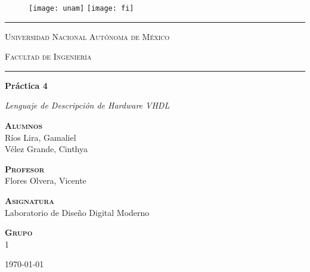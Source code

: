 \documentclass[../main.tex]{subfiles}
\begin{document}
\begin{titlepage}
  \begin{figure}[ht]
    \texttt{[image: unam]}
    \label{EscudoUNAM}
    \endminipage
    \texttt{[image: fi]}
    \label{EscudoFI}
    \endminipage
  \end{figure}

  \begin{center}
    \hrule height 0.5mm
    \vspace{0.2cm}
    \LARGE
    \textsc{Universidad Nacional Autónoma de México}

    \vfill
    \LARGE
    \textsc{Facultad de Ingeniería}
    \vspace{0.4cm}
    \hrule height 0.5mm

    \vfill
    \LARGE
    \textbf{Práctica 4}\\
    \vspace{0.8cm}
    \begin{minipage}{15cm}
      \centering
      \Large
      \textit{Lenguaje de Descripción de Hardware VHDL}
    \end{minipage}

    \vfill
    \large
    {\scshape \bfseries Alumnos}\\
    \vspace{.3cm}
    \large
    Ríos Lira, Gamaliel \\ Vélez Grande, Cinthya

    \vfill
    \large
    {\scshape \bfseries Profesor}\\
    \vspace{.3cm}
    \large
    Flores Olvera, Vicente

    \vfill
    \large
    {\scshape \bfseries Asignatura}\\
    \vspace{.3cm}
    \large
    Laboratorio de Diseño Digital Moderno

    \vfill
    \large
    {\scshape \bfseries Grupo}\\
    \vspace{.3cm}
    \large
    1

    \vfill
    \today
  \end{center}
\end{titlepage}
\end{document}
